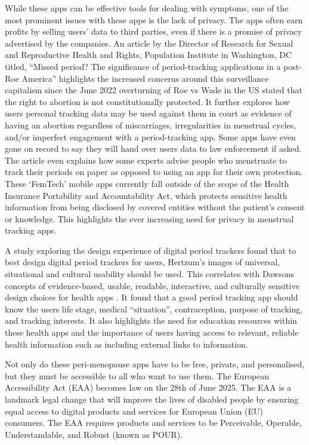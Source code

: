 While these apps can be effective tools for dealing with symptoms, one of the most prominent issues with these apps is the lack of privacy. The apps often earn profits by selling users’ data to third parties, even if there is a promise of privacy advertised by the companies\cite{Gilman2021}. An article by the Director of Research for Sexual and Reproductive Health and Rights, Population Institute in Washington, DC titled, “Missed period? The significance of period-tracking applications in a post-Roe America”\cite{Kelly2023} highlights the increased concerns around this surveillance capitalism since the June 2022 overturning of Roe vs Wade in the US stated that the right to abortion is not constitutionally protected\cite{CoenSanchez2022}. It further explores how users personal tracking data may be used against them in court as evidence of having an abortion regardless of miscarriages, irregularities in menstrual cycles, and/or imperfect engagement with a period-tracking app. Some apps have even gone on record to say they will hand over users data to law enforcement if asked. The article even explains how some experts advise people who menstruate to track their periods on paper as opposed to using an app for their own protection. These `FemTech' mobile apps currently fall outside of the scope of the Health Insurance Portability and Accountability Act, which protects sensitive health information from being disclosed by covered entities without the patient’s consent or knowledge\cite{OCR2022}. This highlights the ever increasing need for privacy in menstrual tracking apps. 

A study\cite{Chan2019} exploring the design experience of digital period trackers found that to best design digital period trackers for users, Hertzum’s images of universal, situational and cultural usability should be used. This correlates with Dawsons concepts of evidence-based, usable, readable, interactive, and culturally sensitive design choices for health apps \cite{Dawson2020}. It found that a good period tracking app should know the users life stage, medical “situation”, contraception, purpose of tracking, and tracking interests. It also highlights the need for education resources within these health apps and the importance of users having access to relevant, reliable health information such as including external links to information. 

Not only do these peri-menopause apps have to be free, private, and personalised, but they must be accessible to all who want to use them. The European Accessibility Act (EAA) becomes law on the 28th of June 2025. The EAA is a landmark legal change that will improve the lives of disabled people by ensuring equal access to digital products and services for European Union (EU) consumers\cite{AbilityNet2024}. The EAA requires products and services to be Perceivable, Operable, Understandable, and Robust (known as POUR). 

